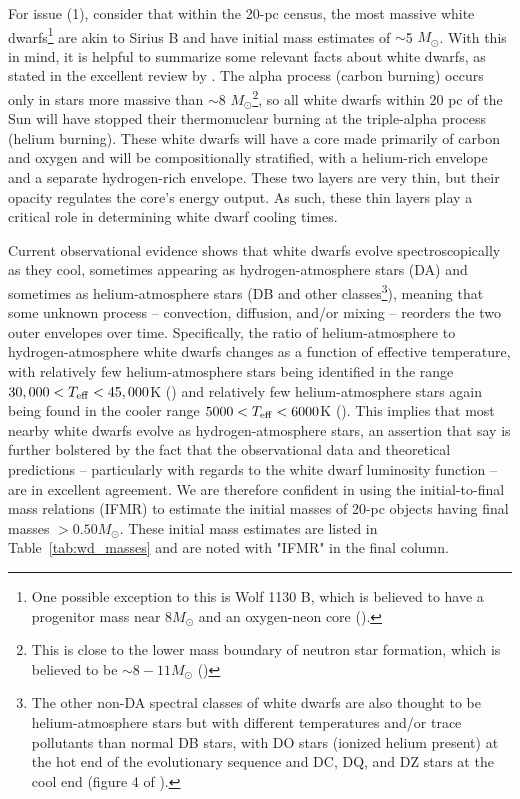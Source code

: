 \documentclass[twocolumn,tighten,twocolappendix]{aastex631}
\begin{document}
For issue (1), consider that within the 20-pc census, the most massive white dwarfs\footnote{One possible exception to this is Wolf 1130 B, which is believed to have a progenitor mass near $8 M_\odot$ and an oxygen-neon core (\citealt{mace2018}).} are akin to Sirius B and have initial mass estimates of $\sim$5 $M_\odot$. With this in mind, it is helpful to summarize some relevant facts about white dwarfs, as stated in the excellent review by \cite{fontaine2001}. The alpha process (carbon burning) occurs only in stars more massive than $\sim$8 $M_\odot$\footnote{This is close to the lower mass boundary of neutron star formation, which is believed to be $\sim8-11 M_\odot$ (\citealt{woosley2002})}, so all white dwarfs within 20 pc of the Sun will have stopped their thermonuclear burning at the triple-alpha process (helium burning). These white dwarfs will have a core made primarily of carbon and oxygen and will be compositionally stratified, with a helium-rich envelope and a separate hydrogen-rich envelope. These two layers are very thin, but their opacity regulates the core's energy output. As such, these thin layers play a critical role in determining white dwarf cooling times. 

Current observational evidence shows that white dwarfs evolve spectroscopically as they cool, sometimes appearing as hydrogen-atmosphere stars (DA) and sometimes as helium-atmosphere stars (DB and other classes\footnote{The other non-DA spectral classes of white dwarfs are also thought to be helium-atmosphere stars but with different temperatures and/or trace pollutants than normal DB stars, with DO stars (ionized helium present) at the hot end of the evolutionary sequence and DC, DQ, and DZ stars at the cool end (figure 4 of \citealt{fontaine2013}).}), meaning that some unknown process -- convection, diffusion, and/or mixing -- reorders the two outer envelopes over time. Specifically, the ratio of helium-atmosphere to hydrogen-atmosphere white dwarfs changes as a function of effective temperature, with relatively few helium-atmosphere stars being identified in the range $30,000 < T_{\rm eff} < 45,000$K (\citealt{shibahashi2007}) and relatively few helium-atmosphere stars again being found in the cooler range $5000 < T_{\rm eff} < 6000$K (\citealt{bergeron1997}). This implies that most nearby white dwarfs evolve as hydrogen-atmosphere stars, an assertion that \cite{fontaine2001} say is further bolstered by the fact that the observational data and theoretical predictions -- particularly with regards to the white dwarf luminosity function -- are in excellent agreement. We are therefore confident in using the initial-to-final mass relations (IFMR) to estimate the initial masses of 20-pc objects having final masses $>0.50 M_\odot$. These initial mass estimates are listed in Table~\ref{tab:wd_masses} and are noted with "IFMR" in the final column.
\end{document}

